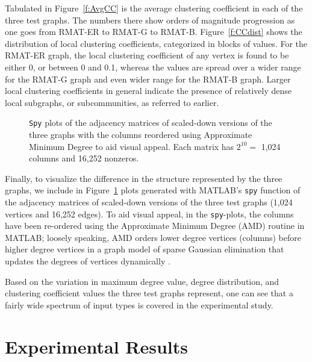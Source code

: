 \documentclass{article}
\begin{document}
Tabulated in Figure~\ref{f:AvgCC} is the average clustering coefficient in each of the three test graphs. 
The numbers there show orders of magnitude progression as one goes from 
RMAT-ER to RMAT-G to RMAT-B. 
Figure~\ref{f:CCdist} shows the distribution of local clustering coefficients, 
categorized in  blocks of values. For the RMAT-ER graph, the local clustering coefficient
of any vertex is found to be either 0, or between 0 and 0.1, whereas the values are spread
over a wider  range for the RMAT-G graph and even wider range for the RMAT-B graph.
Larger local clustering coefficients in general indicate the presence of relatively 
dense local subgraphs, or subcommunities, as referred to earlier.

\begin{figure}
\centering
{}
\caption{{\tt Spy} plots of the adjacency matrices of scaled-down versions of
the three graphs with the columns reordered using Approximate Minimum Degree to aid visual appeal.
Each matrix has $2^{10} = $ 1,024 columns and 16,252 nonzeros. }
\label{f:spyplots-amd}
\end{figure}


Finally, to visualize the difference in the structure represented by the three graphs,
we include in Figure~\ref{f:spyplots-amd} plots generated with
MATLAB's {\tt spy} function of the adjacency matrices of scaled-down versions of the three
test graphs (1,024 vertices and 16,252 edges). 
To aid visual appeal, in the {\tt spy}-plots, the columns have been re-ordered
using the Approximate Minimum Degree (AMD) routine in MATLAB;  loosely speaking, 
AMD orders lower degree vertices (columns) before higher degree vertices 
in a graph model of sparse Gaussian elimination that updates 
the degrees of vertices dynamically \cite{amestoy+}. 

Based on the variation in maximum degree value, degree distribution, and
clustering coefficient values the three test graphs represent, one can see that a 
fairly wide spectrum of input types is covered in the experimental study.

\section{Experimental Results}
\label{sec:results}
\end{document}
